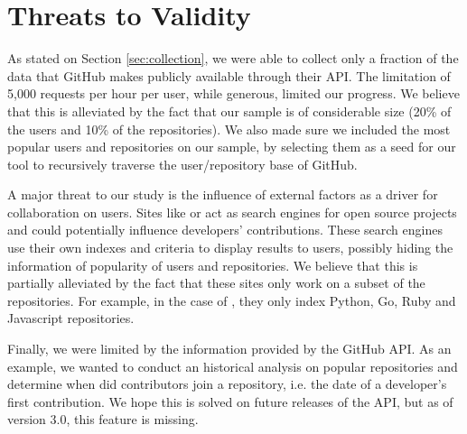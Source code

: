
\section{Threats to Validity}
\label{sec:threats}

As stated on Section \ref{sec:collection}, we were able to collect only a fraction of the data that GitHub makes publicly available through their API. The limitation of 5,000 requests per hour per user, while generous, limited our progress. We believe that this is alleviated by the fact that our sample is of considerable size (20\% of the users and 10\% of the repositories). We also made sure we included the most popular users and repositories on our sample, by selecting them as a seed for our tool to recursively traverse the user/repository base of GitHub.

A major threat to our study is the influence of external factors as a driver for collaboration on users. Sites like \cite{SourceGraph} or \cite{OhLoh} act as search engines for open source projects and could potentially influence developers' contributions. These search engines use their own indexes and criteria to display results to users, possibly hiding the information of popularity of users and repositories. We believe that this is partially alleviated by the fact that these sites only work on a subset of the repositories. For example, in the case of \cite{SourceGraph}, they only index Python, Go, Ruby and Javascript repositories.

Finally, we were limited by the information provided by the GitHub API. As an example, we wanted to conduct an historical analysis on popular repositories and determine when did contributors join a repository, i.e. the date of a developer's first contribution. We hope this is solved on future releases of the API, but as of version 3.0, this feature is missing.
